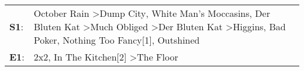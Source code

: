 \begin{supertabular}{p{0.03\textwidth}p{0.92\textwidth}}
 \textbf{S1}:  &  October Rain\textsuperscript{} \textgreater \enspace Dump City\textsuperscript{}, \enspace White Man's Moccasins\textsuperscript{}, \enspace Der Bluten Kat\textsuperscript{} \textgreater \enspace Much Obliged\textsuperscript{} \textgreater \enspace Der Bluten Kat\textsuperscript{} \textgreater \enspace Higgins\textsuperscript{}, \enspace Bad Poker\textsuperscript{}, \enspace Nothing Too Fancy[1]\textsuperscript{}, \enspace Outshined\textsuperscript{}  \enspace  \\
 \textbf{E1}:  &                                                                                                                                                                                                                                                                                                                                                   2x2\textsuperscript{}, \enspace In The Kitchen[2]\textsuperscript{} \textgreater \enspace The Floor\textsuperscript{}  \enspace  \\
\end{supertabular}
